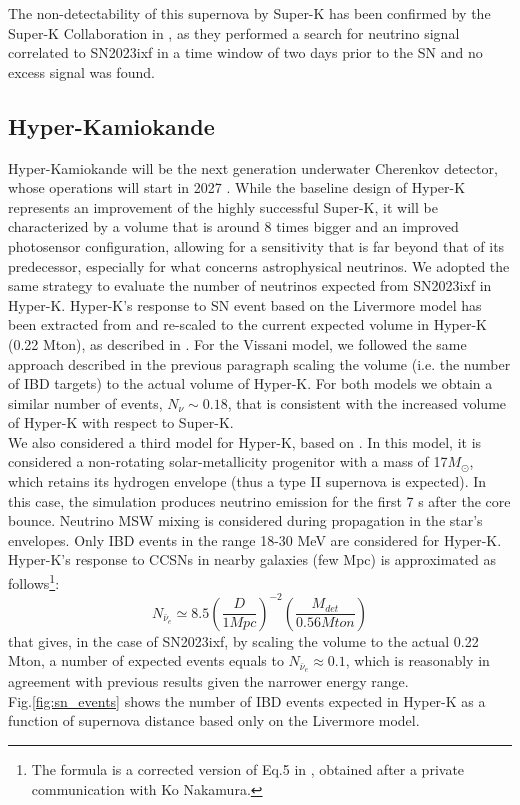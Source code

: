 \documentclass[twocolumn]{aastex631}
\newcommand{\Mo}{M_{\odot}}
\begin{document}
The non-detectability of this supernova by Super-K has been confirmed by the Super-K Collaboration in \cite{atel_sk}, as they performed a search for neutrino signal correlated to SN2023ixf in a time window of two days prior to the SN and no excess signal was found. 

\subsection{Hyper-Kamiokande}

Hyper-Kamiokande will be the next generation underwater Cherenkov detector, whose operations will start in 2027 \citep{art:HK}. While the baseline design of Hyper-K represents an improvement of the highly successful Super-K, it will be characterized by a volume that is around 8 times bigger and an improved photosensor configuration, allowing for a sensitivity that is far beyond that of its predecessor, especially for what concerns astrophysical neutrinos. We adopted the same strategy to evaluate the number of neutrinos expected from SN2023ixf in Hyper-K. Hyper-K's response to SN event based on the Livermore model has been extracted from \cite{art:HK} and re-scaled to the current expected volume in Hyper-K (0.22 Mton), as described in \cite{art:HK_sn}.
For the Vissani model, we followed the same approach described in the previous paragraph scaling the volume (i.e. the number of IBD targets) to the actual volume of Hyper-K. For both models we obtain a similar number of events, $N_{\nu}\sim0.18$, that is consistent with the increased volume of Hyper-K with respect to Super-K. \\
We also considered a third model for Hyper-K,  based on \cite{nakamura}.  In this model, it is considered a non-rotating solar-metallicity progenitor with a mass of 17$\Mo$, which retains its hydrogen envelope (thus a type II supernova is expected). In this case, the simulation produces neutrino emission for the first 7 s after the core bounce. Neutrino MSW mixing is considered during propagation in the star's envelopes. Only IBD events in the range 18-30 MeV are considered for Hyper-K. Hyper-K's response to CCSNs in nearby galaxies (few Mpc) is approximated as follows\footnote{The formula is a corrected version of Eq.5 in \cite{nakamura}, obtained after a private communication with Ko Nakamura.}: 
\begin{equation}
    N_{\bar{\nu}_e}\simeq8.5\left(\dfrac{D}{1Mpc}\right)^{-2}\left(\dfrac{M_{det}}{0.56Mton}\right)
\end{equation}
that gives, in the case of SN2023ixf, by scaling the volume to the actual 0.22 Mton, a number of expected events equals to $N_{\bar{\nu}_e}\approx0.1$, which is reasonably in agreement with previous results given the narrower energy range.\\
Fig.\ref{fig:sn_events} shows the number of IBD events expected in Hyper-K as a function of supernova distance based only on the Livermore model.  
\end{document}
